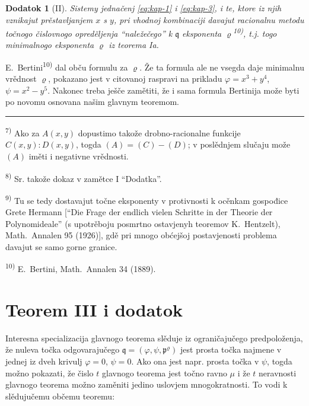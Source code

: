 \documentclass[11pt]{article}
\newcommand{\foreign}[1]{#1}
\theoremstyle{plain}
\newtheorem{zusatz}{Dodatok}
\begin{document}
\begin{zusatz}[II]
Sistemy jednačenj \eqref{eq:kap-1} i \eqref{eq:kap-3}, i te, ktore
iz njih vznikajut prěstavljanjem $x$ s $y$, pri vhodnoj kombinaciji
davajut racionalnu metodu točnogo čislovnogo opreděljenja
``naležečego'' k $\mathfrak{q}$ eksponenta
$\varrho$\textsuperscript{10)}, t.j. togo minimalnogo eksponenta
$\varrho$ iz teorema Ia.
\end{zusatz}

E.\ Bertini\textsuperscript{10)} dal obču formulu za $\varrho$.
Že ta formula ale ne vsegda daje minimalnu vrědnost $\varrho$,
pokazano jest v citovanoj raspravi na prikladu
$\varphi = x^{3} + y^{4}$, $\psi = x^{2} - y^{5}$. Nakonec treba
ješče zamětiti, že i sama formula Bertinija može byti po novomu
osnovana našim glavnym teoremom.

\vspace{0.5em}
\noindent\rule{\textwidth}{0.4pt}
\vspace{0.3em}

{\footnotesize
\textsuperscript{7)} Ako za $A(x,y)$ dopustimo takože drobno-racionalne
funkcije $C(x,y):D(x,y)$, togda $(A) = (C) - (D)$; v poslědnjem
slučaju može $(A)$ iměti i negativne vrědnosti.

\textsuperscript{8)} Sr. takože dokaz v zamětce I ``Dodatka''.

\textsuperscript{9)} Tu se tedy dostavajut točne eksponenty v protivnosti k
ocěnkam gospođice Grete Hermann [``Die Frage der endlich vielen Schritte
in der Theorie der Polynomideale'' (s upotrěboju posmrtno ostavjenyh
teoremov K.\ Hentzelt), \foreign{Math.\ Annalen} 95 (1926)], gdě pri
mnogo obćejšoj postavjenosti problema davajut se samo gorne granice.

\textsuperscript{10)} E.\ Bertini, \foreign{Math.\ Annalen} 34 (1889).
}

\newpage
\section*{Teorem III i dodatok}

Interesna specializacija glavnogo teorema slěduje iz ograničajučego
predpoloženja, že nuleva točka odgovarajučego
$\mathfrak{q} = (\varphi, \psi, \mathfrak{p}^{\varrho})$ jest prosta
točka najmene v jednej iz dveh krivulj $\varphi = 0$, $\psi = 0$.
Ako ona jest napr. prosta točka v $\psi$, togda možno pokazati, že
čislo $t$ glavnogo teorema jest točno ravno $\mu$ i že $t$
neravnosti glavnogo teorema možno zaměniti jedino uslovjem
mnogokratnosti. To vodi k slědujučemu občemu teoremu:
\end{document}
